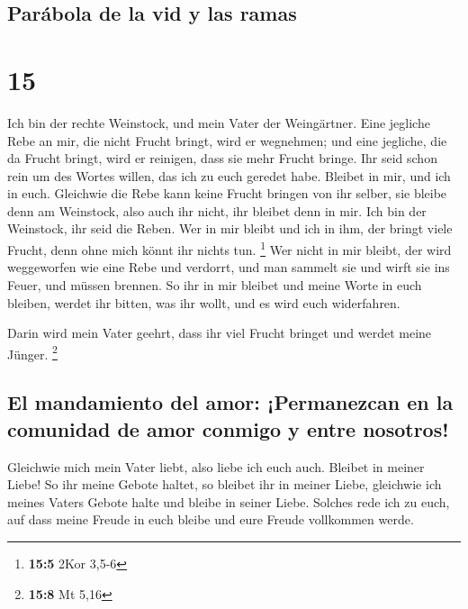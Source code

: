 \hypertarget{paruxe1bola-de-la-vid-y-las-ramas}{%
\subsection{Parábola de la vid y las
ramas}\label{paruxe1bola-de-la-vid-y-las-ramas}}

\hypertarget{section-14}{%
\section{15}\label{section-14}}

 Ich bin der rechte Weinstock, und mein Vater der
Weingärtner.  Eine jegliche Rebe an mir, die nicht Frucht
bringt, wird er wegnehmen; und eine jegliche, die da Frucht bringt, wird
er reinigen, dass sie mehr Frucht bringe.  Ihr seid schon
rein um des Wortes willen, das ich zu euch geredet habe. 
Bleibet in mir, und ich in euch. Gleichwie die Rebe kann keine Frucht
bringen von ihr selber, sie bleibe denn am Weinstock, also auch ihr
nicht, ihr bleibet denn in mir.  Ich bin der Weinstock,
ihr seid die Reben. Wer in mir bleibt und ich in ihm, der bringt viele
Frucht, denn ohne mich könnt ihr nichts tun. \footnote{\textbf{15:5}
  2Kor 3,5-6}  Wer nicht in mir bleibt, der wird
weggeworfen wie eine Rebe und verdorrt, und man sammelt sie und wirft
sie ins Feuer, und müssen brennen.  So ihr in mir bleibet
und meine Worte in euch bleiben, werdet ihr bitten, was ihr wollt, und
es wird euch widerfahren.

 Darin wird mein Vater geehrt, dass ihr viel Frucht
bringet und werdet meine Jünger. \footnote{\textbf{15:8} Mt 5,16}

\hypertarget{el-mandamiento-del-amor-permanezcan-en-la-comunidad-de-amor-conmigo-y-entre-nosotros}{%
\subsection{El mandamiento del amor: ¡Permanezcan en la comunidad de
amor conmigo y entre
nosotros!}\label{el-mandamiento-del-amor-permanezcan-en-la-comunidad-de-amor-conmigo-y-entre-nosotros}}

 Gleichwie mich mein Vater liebt, also liebe ich euch
auch. Bleibet in meiner Liebe!  So ihr meine Gebote
haltet, so bleibet ihr in meiner Liebe, gleichwie ich meines Vaters
Gebote halte und bleibe in seiner Liebe.  Solches rede
ich zu euch, auf dass meine Freude in euch bleibe und eure Freude
vollkommen werde.

